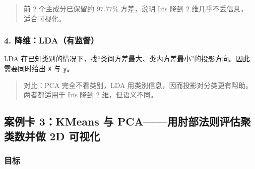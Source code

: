 \begin{quote}
前 2 个主成分已保留约 97.77\% 方差，说明 Iris 降到 2
维几乎不丢信息，适合可视化。
\end{quote}

\subsubsection{4.
降维：LDA（有监督）}\label{ux964dux7ef4ldaux6709ux76d1ux7763}

LDA
在已知类别的情况下，找``类间方差最大、类内方差最小''的投影方向。因此需要同时给出
\texttt{X} 与 \texttt{y}。

\begin{Shaded}
\begin{Highlighting}[]

\OperatorTok{=}\OperatorTok{=}\NormalTok{)}
\OperatorTok{=}
\NormalTok{(}\NormalTok{))}
\end{Highlighting}
\end{Shaded}

\begin{Shaded}
\begin{Highlighting}[]
\end{Highlighting}
\end{Shaded}

\begin{quote}
对比：PCA 完全不看类别，LDA
用类别信息，因而投影对分类更有帮助。两者都适用于 Iris 降到 2
维，但语义不同。
\end{quote}

\subsection{案例卡 3：KMeans 与 PCA------用肘部法则评估聚类数并做 2D
可视化}\label{ux6848ux4f8bux5361-3kmeans-ux4e0e-pcaux7528ux8098ux90e8ux6cd5ux5219ux8bc4ux4f30ux805aux7c7bux6570ux5e76ux505a-2d-ux53efux89c6ux5316}

\subsubsection{目标}\label{ux76eeux6807-32}

